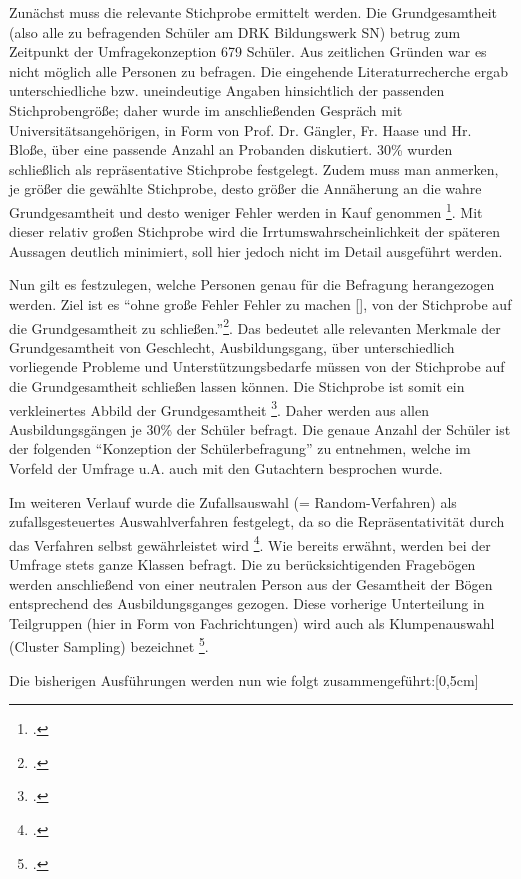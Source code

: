 Zunächst muss die relevante Stichprobe ermittelt werden. Die Grundgesamtheit (also alle zu befragenden Schüler am DRK Bildungswerk SN) betrug zum Zeitpunkt der Umfragekonzeption 679 Schüler. Aus zeitlichen Gründen war es nicht möglich alle Personen zu befragen. Die eingehende Literaturrecherche ergab unterschiedliche bzw. uneindeutige Angaben hinsichtlich der passenden Stichprobengröße; daher wurde im anschließenden Gespräch mit Universitätsangehörigen, in Form von Prof. Dr. Gängler, Fr. Haase und Hr. Bloße, über eine passende Anzahl an Probanden diskutiert. 30\% wurden schließlich als repräsentative Stichprobe festgelegt. Zudem muss man anmerken, je größer die gewählte Stichprobe, desto größer die Annäherung an die wahre Grundgesamtheit und desto weniger Fehler werden in Kauf genommen \footcite[vgl.][65f]{Mayer2013}. Mit dieser relativ großen Stichprobe wird die Irrtumswahrscheinlichkeit der späteren Aussagen deutlich minimiert, soll hier jedoch nicht im Detail ausgeführt werden. 

Nun gilt es festzulegen, welche Personen genau für die Befragung herangezogen werden. Ziel ist es "`ohne große Fehler Fehler zu machen [\punkte], von der Stichprobe auf die Grundgesamtheit zu schließen."'\footcite[60]{Mayer2013}. Das bedeutet alle relevanten Merkmale der Grundgesamtheit von Geschlecht, Ausbildungsgang, über unterschiedlich vorliegende Probleme und Unterstützungsbedarfe müssen von der Stichprobe auf die Grundgesamtheit schließen lassen können. Die Stichprobe ist somit ein verkleinertes Abbild der Grundgesamtheit \footcite [vgl.][197]{Kromrey1995}. Daher werden aus allen Ausbildungsgängen je 30\% der Schüler befragt. Die genaue Anzahl der Schüler ist der folgenden "`Konzeption der Schülerbefragung"' zu entnehmen, welche im Vorfeld der Umfrage u.A. auch mit den Gutachtern besprochen wurde.

Im weiteren Verlauf wurde die Zufallsauswahl (= Random-Verfahren) als zufallsgesteuertes Auswahlverfahren festgelegt, da so die Repräsentativität durch das Verfahren selbst gewährleistet wird \footcite[vgl.][60]{Mayer2013}. Wie bereits erwähnt, werden bei der Umfrage stets ganze Klassen befragt. Die zu berücksichtigenden Fragebögen werden anschließend von einer neutralen Person aus der Gesamtheit der Bögen entsprechend des Ausbildungsganges gezogen. Diese vorherige Unterteilung in Teilgruppen (hier in Form von Fachrichtungen) wird auch als Klumpenauswahl (Cluster Sampling) bezeichnet \footcite[vgl.][63]{Mayer2013}.

\newpage
Die bisherigen Ausführungen werden nun wie folgt zusammengeführt:[0,5cm]

